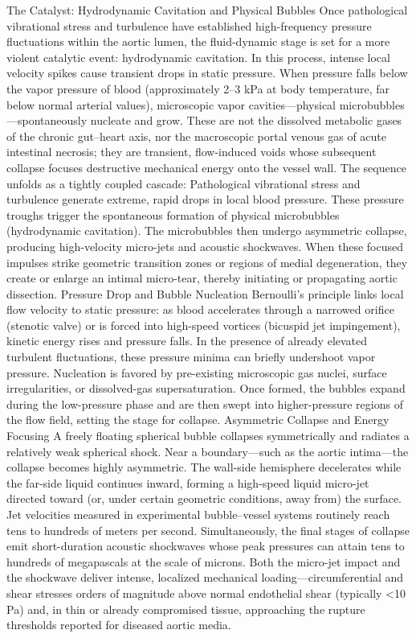 The Catalyst: Hydrodynamic Cavitation and Physical Bubbles
Once pathological vibrational stress and turbulence have established high-frequency pressure fluctuations within the aortic lumen, the fluid-dynamic stage is set for a more violent catalytic event: hydrodynamic cavitation. In this process, intense local velocity spikes cause transient drops in static pressure. When pressure falls below the vapor pressure of blood (approximately 2–3 kPa at body temperature, far below normal arterial values), microscopic vapor cavities—physical microbubbles—spontaneously nucleate and grow. These are not the dissolved metabolic gases of the chronic gut–heart axis, nor the macroscopic portal venous gas of acute intestinal necrosis; they are transient, flow-induced voids whose subsequent collapse focuses destructive mechanical energy onto the vessel wall.
The sequence unfolds as a tightly coupled cascade:
Pathological vibrational stress and turbulence generate extreme, rapid drops in local blood pressure.
These pressure troughs trigger the spontaneous formation of physical microbubbles (hydrodynamic cavitation).
The microbubbles then undergo asymmetric collapse, producing high-velocity micro-jets and acoustic shockwaves.
When these focused impulses strike geometric transition zones or regions of medial degeneration, they create or enlarge an intimal micro-tear, thereby initiating or propagating aortic dissection.
Pressure Drop and Bubble Nucleation
Bernoulli’s principle links local flow velocity to static pressure: as blood accelerates through a narrowed orifice (stenotic valve) or is forced into high-speed vortices (bicuspid jet impingement), kinetic energy rises and pressure falls. In the presence of already elevated turbulent fluctuations, these pressure minima can briefly undershoot vapor pressure. Nucleation is favored by pre-existing microscopic gas nuclei, surface irregularities, or dissolved-gas supersaturation. Once formed, the bubbles expand during the low-pressure phase and are then swept into higher-pressure regions of the flow field, setting the stage for collapse.
Asymmetric Collapse and Energy Focusing
A freely floating spherical bubble collapses symmetrically and radiates a relatively weak spherical shock. Near a boundary—such as the aortic intima—the collapse becomes highly asymmetric. The wall-side hemisphere decelerates while the far-side liquid continues inward, forming a high-speed liquid micro-jet directed toward (or, under certain geometric conditions, away from) the surface. Jet velocities measured in experimental bubble–vessel systems routinely reach tens to hundreds of meters per second. Simultaneously, the final stages of collapse emit short-duration acoustic shockwaves whose peak pressures can attain tens to hundreds of megapascals at the scale of microns. Both the micro-jet impact and the shockwave deliver intense, localized mechanical loading—circumferential and shear stresses orders of magnitude above normal endothelial shear (typically <10 Pa) and, in thin or already compromised tissue, approaching the rupture thresholds reported for diseased aortic media.
